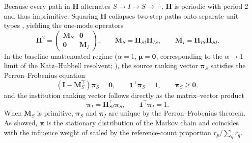 Because every path in $\mathbf{H}$ alternates $S \to I \to S \to \cdots$, $\mathbf{H}$ is periodic with period 2 and thus imprimitive. Squaring $\mathbf{H}$ collapses two-step paths onto separate unit types \citep{breigerDualityPersonsGroups1974}, yielding the one-mode operators
\begin{equation}
    \mathbf{H}^2 = \begin{pmatrix} \mathbf{M}_S & \mathbf{0} \\ \mathbf{0} & \mathbf{M}_I \end{pmatrix}, \qquad
    \mathbf{M}_S = \mathbf{H}_{SI}\mathbf{H}_{IS}, \qquad
    \mathbf{M}_I = \mathbf{H}_{IS}\mathbf{H}_{SI}.
    \label{eq:breiger}
\end{equation}
In the baseline unattenuated regime ($\alpha = 1$, $\boldsymbol{\mu} = \mathbf{0}$, corresponding to the $\alpha \to 1$ limit of the Katz--Hubbell resolvent; \citealp{katzNewStatusIndex1953, hubbellInputoutputApproachClique1965, vignaSpectralRanking2016}), the source ranking vector $\boldsymbol{\pi}_S$ satisfies the Perron--Frobenius equation
\begin{equation}
    (\mathbf{I} - \mathbf{M}_S^\top)\boldsymbol{\pi}_S = \mathbf{0}, \qquad \mathbf{1}^\top\boldsymbol{\pi}_S = 1, \qquad \boldsymbol{\pi}_S \ge \mathbf{0},
    \label{eq:pf_sources}
\end{equation}
and the institution ranking vector follows directly as the matrix--vector product
\begin{equation}
    \boldsymbol{\pi}_I = \mathbf{H}_{SI}^\top \boldsymbol{\pi}_S, \qquad \mathbf{1}^\top\boldsymbol{\pi}_I = 1.
    \label{eq:pf_insts}
\end{equation}
When $\mathbf{M}_S$ is primitive, $\boldsymbol{\pi}_S$ and $\boldsymbol{\pi}_I$ are unique by the Perron--Frobenius theorem. As \citet{gellerCitationInfluenceMethodology1978} showed, $\boldsymbol{\pi}$ is the stationary distribution of the Markov chain and coincides with the influence weight of \citet{pinskiCitationInfluenceJournal1976} scaled by the reference-count proportion $r_p / \sum_q r_q$.

